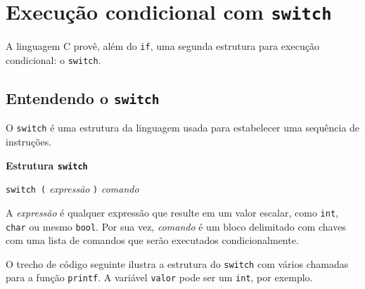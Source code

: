 \documentclass[
  11pt,
  a4paper,
]{scrbook}
\begin{document}
\chapter{\texorpdfstring{Execução condicional com
\texttt{switch}}{Execução condicional com switch}}\label{execuuxe7uxe3o-condicional-com-switch}

A linguagem C provê, além do \texttt{if}, uma segunda estrutura para
execução condicional: o \texttt{switch}.

\section{\texorpdfstring{Entendendo o
\texttt{switch}}{Entendendo o switch}}\label{sec-entendendo-o-switch}

O \texttt{switch} é uma estrutura da linguagem usada para estabelecer
uma sequência de instruções.

\begin{tcolorbox}[enhanced jigsaw, colback=white, arc=.35mm, colframe=quarto-callout-color-frame, toprule=.15mm, leftrule=.75mm, left=2mm, rightrule=.15mm, bottomrule=.15mm, opacityback=0, breakable]

\vspace{-3mm}\textbf{Estrutura \texttt{switch}}\vspace{3mm}

\texttt{switch\ (} \emph{expressão} \texttt{)} \emph{comando}

\end{tcolorbox}

A \emph{expressão} é qualquer expressão que resulte em um valor escalar,
como \texttt{int}, \texttt{char} ou mesmo \texttt{bool}. Por sua vez,
\emph{comando} é um bloco delimitado com chaves com uma lista de
comandos que serão executados condicionalmente.

O trecho de código seguinte ilustra a estrutura do \texttt{switch} com
vários chamadas para a função \texttt{printf}. A variável \texttt{valor}
pode ser um \texttt{int}, por exemplo.
\end{document}
